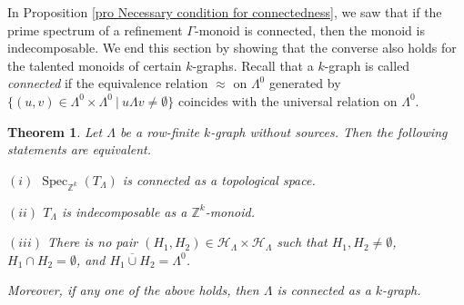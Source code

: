 \documentclass[a4paper,reqno,12pt]{amsart}
\numberwithin{equation}{section}
\newtheorem{thm}{Theorem}[section]
\theoremstyle{definition}
\theoremstyle{remark}
\newcommand{\Spec}{\operatorname{Spec}}
\begin{document}
In Proposition \ref{pro Necessary condition for connectedness}, we saw that if the prime spectrum of a refinement $\Gamma$-monoid is connected, then the monoid is indecomposable. We end this section by showing that the converse also holds for the talented monoids of certain $k$-graphs. Recall that a $k$-graph is called \emph{connected} if the equivalence relation $\approx$ on $\Lambda^0$ generated by $\{(u,v)\in \Lambda^0\times \Lambda^0~|~u\Lambda v\neq \emptyset\}$ coincides with the universal relation on $\Lambda^0$.

\begin{thm}\label{th connectedness of spectrum of TM}
Let $\Lambda$ be a row-finite $k$-graph without sources. Then the following statements are equivalent. 

$(i)$ $\Spec_{\mathbb{Z}^k}(T_\Lambda)$ is connected as a topological space.

$(ii)$ $T_\Lambda$ is indecomposable as a $\mathbb{Z}^k$-monoid.

$(iii)$ There is no pair $(H_1,H_2)\in \mathcal{H}_\Lambda\times \mathcal{H}_\Lambda$ such that $H_1,H_2\neq \emptyset$, $H_1\cap H_2=\emptyset$, and $\overline{H_1\cup H_2}=\Lambda^0$. 

Moreover, if any one of the above holds, then $\Lambda$ is connected as a $k$-graph.
\end{thm}
\end{document}
